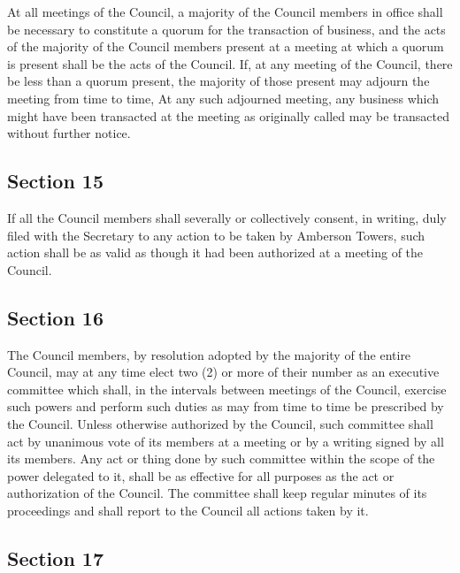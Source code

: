 \documentclass[
]{book}
\begin{document}
At all meetings of the Council, a majority of the Council members in office shall be necessary to constitute a quorum for the transaction of business, and the acts of the majority of the Council members present at a meeting at which a quorum is present shall be the acts of the Council. If, at any meeting of the Council, there be less than a quorum present, the majority of those present may adjourn the meeting from time to time, At any such adjourned meeting, any business which might have been transacted at the meeting as originally called may be transacted without further notice.

\hypertarget{section-15}{%
\subsection*{Section 15}\label{section-15}}

If all the Council members shall severally or collectively consent, in writing, duly filed with the Secretary to any action to be taken by Amberson Towers, such action shall be as valid as though it had been authorized at a meeting of the Council.

\hypertarget{section-16}{%
\subsection*{Section 16}\label{section-16}}

The Council members, by resolution adopted by the majority of the entire Council, may at any time elect two (2) or more of their number as an executive committee which shall, in the intervals between meetings of the Council, exercise such powers and perform such duties as may from time to time be prescribed by the Council. Unless otherwise authorized by the Council, such committee shall act by unanimous vote of its members at a meeting or by a writing signed by all its members. Any act or thing done by such committee within the scope of the power delegated to it, shall be as effective for all purposes as the act or authorization of the Council. The committee shall keep regular minutes of its proceedings and shall report to the Council all actions taken by it.

\hypertarget{section-17}{%
\subsection*{Section 17}\label{section-17}}
\end{document}
